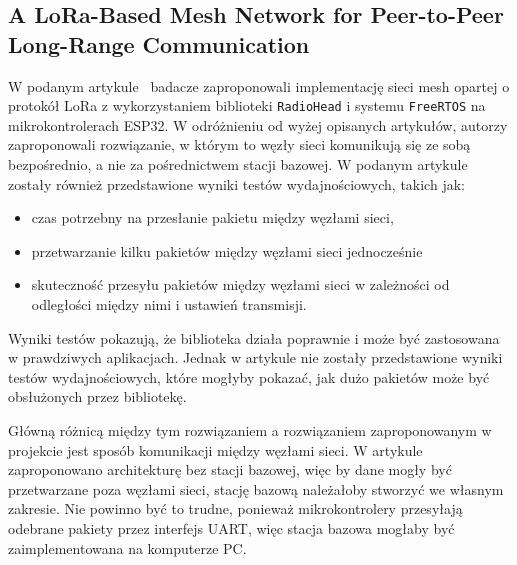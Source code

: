 \subsection{A LoRa-Based Mesh Network for Peer-to-Peer Long-Range Communication}
W podanym artykule~\cite{s21134314} badacze zaproponowali implementację sieci mesh opartej o protokół LoRa z wykorzystaniem biblioteki \texttt{RadioHead} i systemu \texttt{FreeRTOS} na mikrokontrolerach ESP32. W odróżnieniu od wyżej opisanych artykułów, autorzy zaproponowali rozwiązanie, w którym to węzły sieci komunikują się ze sobą bezpośrednio, a nie za pośrednictwem stacji bazowej. W podanym artykule zostały również przedstawione wyniki testów wydajnościowych, takich jak:
\begin{itemize}
    \item czas potrzebny na przesłanie pakietu między węzłami sieci,
    \item przetwarzanie kilku pakietów między węzłami sieci jednocześnie
    \item skuteczność przesyłu pakietów między węzłami sieci w zależności od odległości między nimi i ustawień transmisji.
\end{itemize}

Wyniki testów pokazują, że biblioteka działa poprawnie i może być zastosowana w prawdziwych aplikacjach. Jednak w artykule nie zostały przedstawione wyniki testów wydajnościowych, które mogłyby pokazać, jak dużo pakietów może być obsłużonych przez bibliotekę.

Główną różnicą między tym rozwiązaniem a rozwiązaniem zaproponowanym w projekcie jest sposób komunikacji między węzłami sieci. W artykule zaproponowano architekturę bez stacji bazowej, więc by dane mogły być przetwarzane poza węzłami sieci, stację bazową należałoby stworzyć we własnym zakresie. Nie powinno być to trudne, ponieważ mikrokontrolery przesyłają odebrane pakiety przez interfejs UART, więc stacja bazowa mogłaby być zaimplementowana na komputerze PC.
